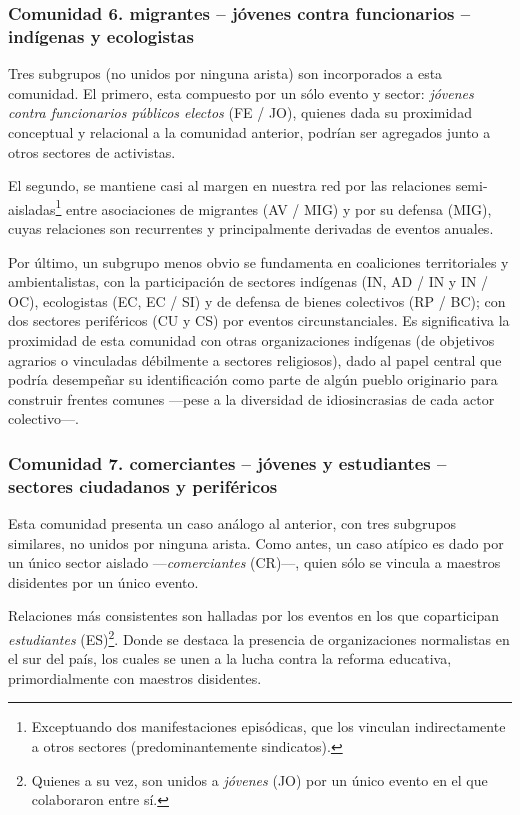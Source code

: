 \documentclass[letterpaper, 11pt]{book}
\theoremstyle{definition}
\theoremstyle{remark}
\begin{document}
\subsubsection{Comunidad 6. migrantes -- jóvenes contra funcionarios -- indígenas y ecologistas}
\label{subsubsec:comunidad6}


Tres subgrupos (no unidos por ninguna arista) son incorporados a esta comunidad. 
El primero, esta compuesto por un sólo evento y sector: \emph{jóvenes contra funcionarios públicos electos} (FE / JO), quienes dada su proximidad conceptual y relacional a la comunidad anterior, podrían ser agregados junto a otros sectores de activistas. 


El segundo, se mantiene casi al margen en nuestra red por las relaciones semi-aisladas\footnote{
    Exceptuando dos manifestaciones episódicas, que los vinculan indirectamente a otros sectores (predominantemente sindicatos). 
} entre asociaciones de migrantes (AV / MIG) y por su defensa (MIG), cuyas relaciones son recurrentes y principalmente derivadas de eventos anuales. 


Por último, un subgrupo menos obvio se fundamenta en coaliciones territoriales y ambientalistas, con la participación de sectores indígenas (IN, AD / IN y IN / OC), ecologistas (EC, EC / SI) y de defensa de bienes colectivos (RP / BC); con dos sectores periféricos (CU y CS) por eventos circunstanciales. 
Es significativa la proximidad de esta comunidad con otras organizaciones indígenas (de objetivos agrarios o vinculadas débilmente a sectores religiosos), dado al papel central que podría desempeñar su identificación como parte de algún pueblo originario para construir frentes comunes ---pese a la diversidad de idiosincrasias de cada actor colectivo---.



\subsubsection{Comunidad 7. comerciantes -- jóvenes y estudiantes -- sectores ciudadanos y periféricos}
\label{subsubsec:comunidad7}

Esta comunidad presenta un caso análogo al anterior, con tres subgrupos similares, no unidos por ninguna arista. 
Como antes, un caso atípico es dado por un único sector aislado ---\emph{comerciantes} (CR)---, quien sólo se vincula a maestros disidentes por un único evento. 


Relaciones más consistentes son halladas por los eventos en los que coparticipan \emph{estudiantes} (ES)\footnote{
    Quienes a su vez, son unidos a \emph{jóvenes} (JO) por un único evento en el que colaboraron entre sí. 
}. 
Donde se destaca la presencia de organizaciones normalistas en el sur del país, los cuales se unen a la lucha contra la reforma educativa, primordialmente con maestros disidentes. 
\end{document}
